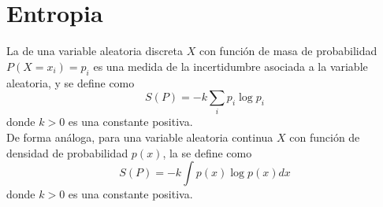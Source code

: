 \section{Entropia}

\begin{definicion}
    La  de una variable aleatoria discreta $X$ con función de masa de probabilidad $P(X=x_i)=p_i$ es una medida de la incertidumbre asociada a la variable aleatoria, y se define como
    \begin{equation*}
        S(P)=-k \sum\limits_{i} p_i \log p_i
    \end{equation*}
    donde $k>0$ es una constante positiva. \\
    De forma análoga, para una variable aleatoria continua $X$ con función de densidad de probabilidad $p(x)$, la  se define como
    \begin{equation*}
        S(P)=-k\int p(x) \log p(x) dx
    \end{equation*}
    donde $k>0$ es una constante positiva. \\
\end{definicion}

